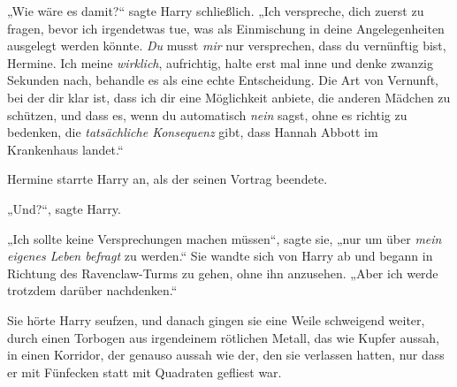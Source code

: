 „Wie wäre es damit?“ sagte Harry schließlich. „Ich verspreche, dich zuerst zu fragen, bevor ich irgendetwas tue, was als Einmischung in deine Angelegenheiten ausgelegt werden könnte. \emph{Du} musst \emph{mir} nur versprechen, dass du vernünftig bist, Hermine. Ich meine \emph{wirklich}, aufrichtig, halte erst mal inne und denke zwanzig Sekunden nach, behandle es als eine echte Entscheidung. Die Art von Vernunft, bei der dir klar ist, dass ich dir eine Möglichkeit anbiete, die anderen Mädchen zu schützen, und dass es, wenn du automatisch \emph{nein} sagst, ohne es richtig zu bedenken, die \emph{tatsächliche Konsequenz} gibt, dass Hannah Abbott im Krankenhaus landet.“

Hermine starrte Harry an, als der seinen Vortrag beendete.

„Und?“, sagte Harry.

„Ich sollte keine Versprechungen machen müssen“, sagte sie, „nur um über \emph{mein eigenes Leben befragt} zu werden.“ Sie wandte sich von Harry ab und begann in Richtung des Ravenclaw-Turms zu gehen, ohne ihn anzusehen. „Aber ich werde trotzdem darüber nachdenken.“

Sie hörte Harry seufzen, und danach gingen sie eine Weile schweigend weiter, durch einen Torbogen aus irgendeinem rötlichen Metall, das wie Kupfer aussah, in einen Korridor, der genauso aussah wie der, den sie verlassen hatten, nur dass er mit Fünfecken statt mit Quadraten gefliest war.

